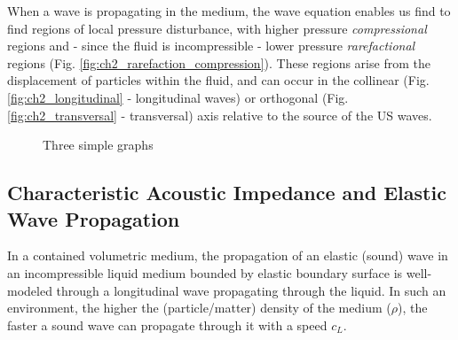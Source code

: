 When a wave is propagating in the medium, 
the wave equation enables us find to find regions 
of local pressure disturbance, with higher pressure 
\textit{compressional} regions and - since the fluid is incompressible - 
lower pressure \textit{rarefactional} regions 
(Fig. \ref{fig:ch2_rarefaction_compression}). 
These regions arise from the displacement of particles 
within the fluid, and can occur in the collinear (Fig. \ref{fig:ch2_longitudinal} - longitudinal waves) or 
orthogonal (Fig. \ref{fig:ch2_transversal} - transversal) axis relative to the source of the US waves.


\begin{figure}[ht]
     \centering
     \hfill
    \caption{Three simple graphs}
    \label{fig:ch2_elastic_waves}
\end{figure}

\subsection{Characteristic Acoustic Impedance and Elastic Wave Propagation}
\label{subsec:ch2_3_propagation}

In a contained volumetric medium, the propagation of an elastic (sound) wave 
in an incompressible liquid medium bounded by elastic boundary surface is 
well-modeled through a longitudinal wave propagating through the liquid. 
In such an environment, the higher the (particle/matter) density of the medium ($\rho$), 
the faster a sound wave can propagate through it with a speed $c_L$.

